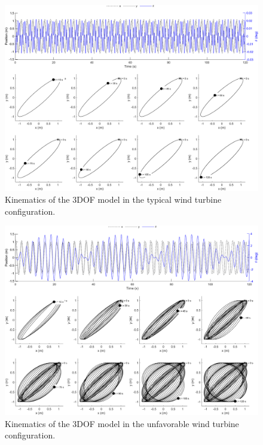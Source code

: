 \documentclass{article}
\begin{document}
\begin{figure}
    \centering
    \includegraphics[width=1\textwidth]{figures/turbine_typical.png}
    \caption{Kinematics of the 3DOF model in the typical wind turbine configuration.}
    \label{fig:3dof-turbine-typical}
\end{figure}

\begin{figure}
    \centering
    \includegraphics[width=1\textwidth]{figures/turbine_unfavorable.png}
    \caption{Kinematics of the 3DOF model in the unfavorable wind turbine configuration.}
    \label{fig:3dof-turbine-unfavorable}
\end{figure}

\clearpage
\end{document}
